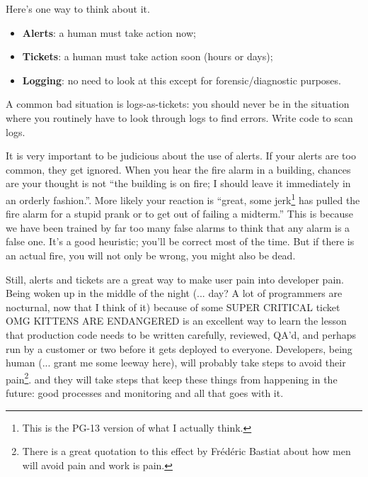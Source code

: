 \documentclass[a4paper]{report}
\begin{document}
Here's one way to think about it. 
\begin{itemize}
\item {\bf Alerts}: a human must take action now;
\item {\bf Tickets}: a human must take action soon (hours or days);
\item {\bf Logging}: no need to look at this except for forensic/diagnostic purposes.
\end{itemize}
A common bad situation is logs-as-tickets: you should never be in the
situation where you routinely have to look through logs to find
errors. Write code to scan logs.

It is very important to be judicious about the use of alerts. If your alerts are too common, they get ignored. When you hear the fire alarm in a building, chances are your thought is not ``the building is on fire; I should leave it immediately in an orderly fashion.''. More likely your reaction is ``great, some jerk\footnote{This is the PG-13 version of what I actually think.} has pulled the fire alarm for a stupid prank or to get out of failing a midterm.'' This is because we have been trained by far too many false alarms to think that any alarm is a false one. It's a good heuristic; you'll be correct most of the time. But if there is an actual fire, you will not only be wrong, you might also be dead.

Still, alerts and tickets are a great way to make user pain into developer pain. Being woken up in the middle of the night (... day? A lot of programmers are nocturnal, now that I think of it) because of some SUPER CRITICAL ticket OMG KITTENS ARE ENDANGERED is an excellent way to learn the lesson that production code needs to be written carefully, reviewed, QA'd, and perhaps run by a customer or two before it gets deployed to everyone. Developers, being human (... grant me some leeway here), will probably take steps to avoid their pain\footnote{There is a great quotation to this effect by Fr\'ed\'eric Bastiat about how men will avoid pain and work is pain.}. and they will take steps that keep these things from happening in the future: good processes and monitoring and all that goes with it.






\end{document}
